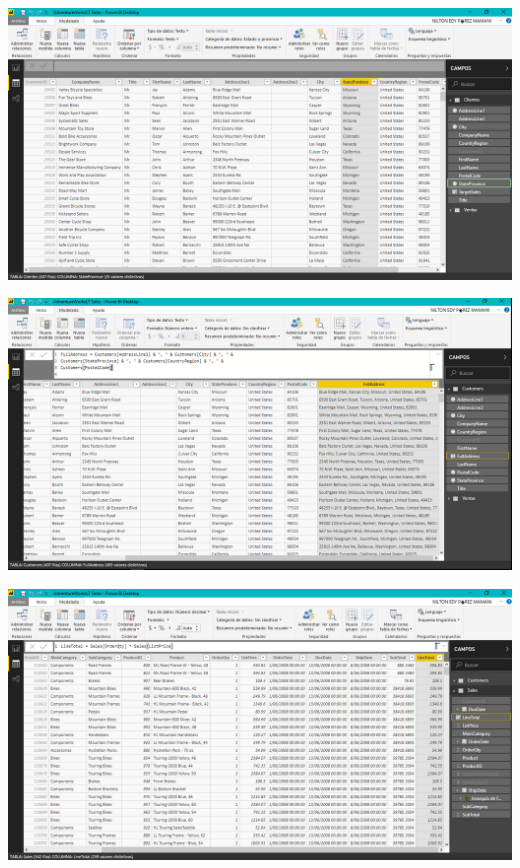 \begin{center}
\includegraphics[width=15cm]{./Imagenes/imagen8}
\end{center}

\begin{center}
\includegraphics[width=15cm]{./Imagenes/imagen9}
\end{center}

\begin{center}
\includegraphics[width=15cm]{./Imagenes/imagen10}
\end{center}

